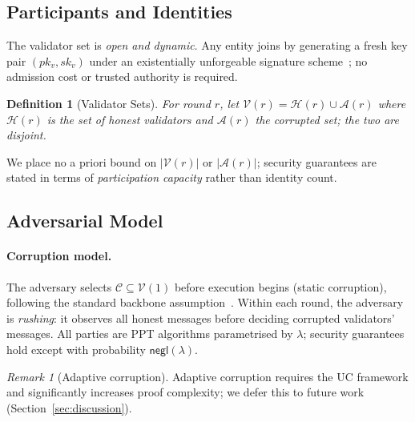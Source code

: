 \documentclass[10pt,journal,twoside]{IEEEtran}
\newtheorem{definition}[theorem]{Definition}
\theoremstyle{remark}
\newtheorem{remark}{Remark}[section]
\newcommand{\negl}{\mathsf{negl}}
\begin{document}
	\subsection{Participants and Identities}
	\label{ssec:identity}
	
	The validator set is \emph{open and dynamic}.
	Any entity joins by generating a fresh key pair
	$(pk_v, sk_v)$ under an existentially unforgeable
	signature scheme~\cite{goldreich2001foundations};
	no admission cost or trusted authority is required.
	
	\begin{definition}[Validator Sets]
		\label{def:valsets}
		For round $r$, let $\mathcal{V}(r) = \mathcal{H}(r)
		\cup \mathcal{A}(r)$ where $\mathcal{H}(r)$ is the set
		of honest validators and $\mathcal{A}(r)$ the corrupted
		set; the two are disjoint.
	\end{definition}
	
	We place no a priori bound on $|\mathcal{V}(r)|$ or
	$|\mathcal{A}(r)|$; security guarantees are stated in terms
	of \emph{participation capacity} rather than identity count.
	
	\subsection{Adversarial Model}
	\label{ssec:adversary}
	
	\paragraph{Corruption model.}
	The adversary selects $\mathcal{C} \subseteq \mathcal{V}(1)$
	before execution begins (static corruption), following the
	standard backbone
	assumption~\cite{garay2015bitcoin,pass2017hybrid}.
	Within each round, the adversary is \emph{rushing}: it
	observes all honest messages before deciding corrupted
	validators' messages.
	All parties are PPT algorithms parametrised by $\lambda$;
	security guarantees hold except with probability
	$\negl(\lambda)$.
	
	\begin{remark}[Adaptive corruption]
		\label{rem:adaptive}
		Adaptive corruption requires the UC framework and
		significantly increases proof complexity; we defer
		this to future work (Section~\ref{sec:discussion}).
	\end{remark}
	
\end{document}
